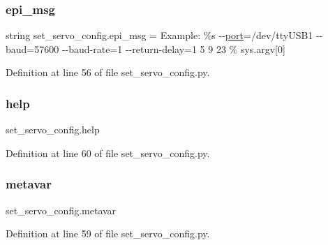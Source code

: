 \subsubsection{\texorpdfstring{epi\+\_\+msg}{epi\_msg}}
{\footnotesize\ttfamily string set\+\_\+servo\+\_\+config.\+epi\+\_\+msg = \textquotesingle{}Example\+: \%s -\/-\/\hyperlink{namespaceset__servo__config_a324ec25da2c0124a9184e551f96f1419}{port}=/dev/tty\+U\+S\+B1 -\/-\/baud=57600 -\/-\/baud-\/rate=1 -\/-\/return-\/delay=1 5 9 23\textquotesingle{} \% sys.\+argv\mbox{[}0\mbox{]}}



Definition at line 56 of file set\+\_\+servo\+\_\+config.\+py.

\mbox{\label{namespaceset__servo__config_abb77c82a1847ecaa4cae095059a0f025}} 
\subsubsection{\texorpdfstring{help}{help}}
{\footnotesize\ttfamily set\+\_\+servo\+\_\+config.\+help}



Definition at line 60 of file set\+\_\+servo\+\_\+config.\+py.

\mbox{\label{namespaceset__servo__config_aa5d67729fdd1fb79530eed591683ce69}} 
\subsubsection{\texorpdfstring{metavar}{metavar}}
{\footnotesize\ttfamily set\+\_\+servo\+\_\+config.\+metavar}



Definition at line 59 of file set\+\_\+servo\+\_\+config.\+py.

\mbox{\label{namespaceset__servo__config_aaa903250c8425443f306994f3f66c073}} 
